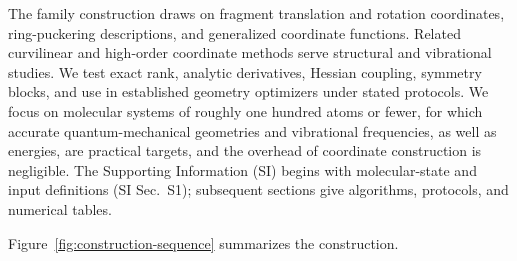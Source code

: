 \documentclass[journal=jctcce,manuscript=article,layout=traditional]{achemso}
\theoremstyle{definition}
\begin{document}
{The family construction draws on fragment translation and
rotation coordinates, ring-puckering descriptions, and generalized
coordinate functions.\cite{BilleterTurnerThiel2000HDLC,WangSong2016GeomeTRIC,CremerPople1975,HillReilly2007,Zou2011RingDeformation}
Related curvilinear and high-order coordinate methods serve structural and
vibrational studies.\cite{Mendolicchio2023Curvilinear,BoyerTabor2026Transformations,Zauleck2016ReducedCoordinates,Krautgasser2016Surface}
We test exact rank, analytic derivatives, Hessian coupling, symmetry blocks,
and use in established geometry optimizers under stated protocols.\cite{Schlegel2011Optimization,Shajan2023Optimizers}
We focus on molecular systems of roughly one hundred atoms or fewer, for
which accurate quantum-mechanical geometries and vibrational frequencies,
as well as energies, are practical targets,\cite{BaroneLazzariMendolicchio2026PTD} and the overhead of coordinate construction is negligible. The Supporting Information (SI) begins with molecular-state and input
definitions (SI Sec.~S1); subsequent sections give algorithms, protocols, and
numerical tables.}

Figure~\ref{fig:construction-sequence} summarizes the construction.
\end{document}
